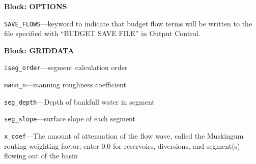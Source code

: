 
\item \textbf{Block: OPTIONS}

\begin{description}
\item \texttt{SAVE\_FLOWS}---keyword to indicate that budget flow terms will be written to the file specified with ``BUDGET SAVE FILE'' in Output Control.

\end{description}
\item \textbf{Block: GRIDDATA}

\begin{description}
\item \texttt{iseg\_order}---segment calculation order

\item \texttt{mann\_n}---manning roughness coefficient

\item \texttt{seg\_depth}---Depth of bankfull water in segment

\item \texttt{seg\_slope}---surface slope of each segment

\item \texttt{x\_coef}---The amount of attenuation of the flow wave, called the Muskingum routing weighting factor; enter 0.0 for reservoirs, diversions, and segment(s) flowing out of the basin

\end{description}

